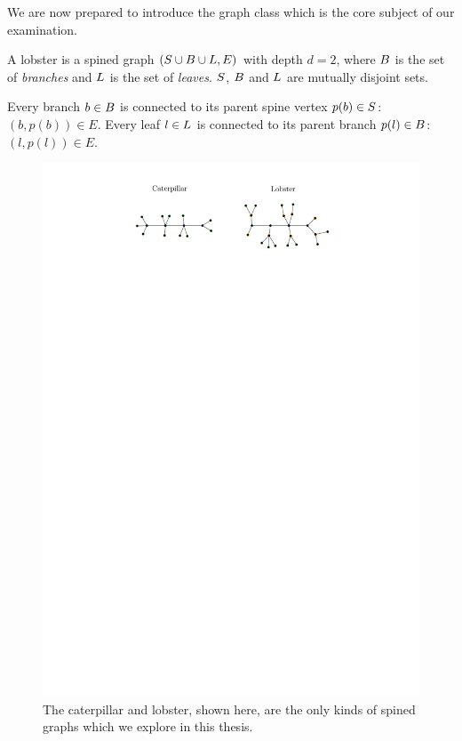 We are now prepared to introduce the graph class which is the core subject of our examination.

\begin{definition}[Lobster]
A lobster is a spined graph $(S \cup B \cup L, E)$ with depth $d=2$, where $B$ is the set of \emph{branches} and $L$ is the set of \emph{leaves}.  $S$, $B$ and $L$ are mutually disjoint sets.

Every branch $b \in B$ is connected to its parent spine vertex $p(b) \in S$: $(b, p(b)) \in E$. Every leaf $l \in L$ is connected to its parent branch $p(l) \in B$: $(l, p(l)) \in E$.
\end{definition}

\begin{figure}
    \centering
    \includegraphics{graphics/ch2_caterpillar_lobster.pdf}
    \caption{The caterpillar and lobster, shown here, are the only kinds of spined graphs which we explore in this thesis.}
    \label{fig:ch2_caterpillar_lobster}
\end{figure}

